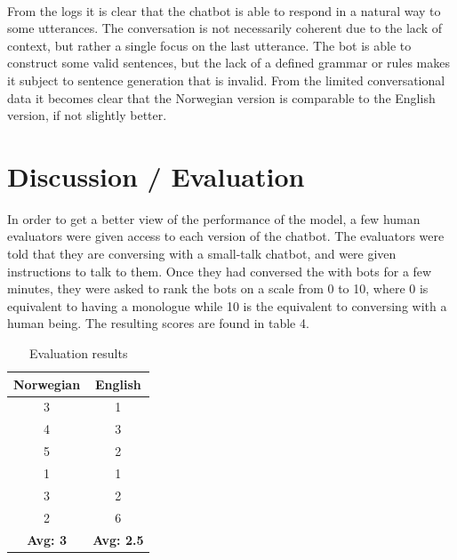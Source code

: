 \documentclass{article}
\begin{document}
\paragraph{}
From the logs it is clear that the chatbot is able to respond in a natural way
to some utterances. The conversation is not necessarily coherent due to the
lack of context, but rather a single focus on the last utterance. The bot is
able to construct some valid sentences, but the lack of a defined grammar or
rules makes it subject to sentence generation that is invalid.
From the limited conversational data it becomes clear that the Norwegian
version is comparable to the English version, if not slightly better.

\section*{Discussion / Evaluation}



In order to get a better view of the performance of the model, a few human
evaluators were given access to each version of the chatbot. The evaluators
were told that they are conversing with a small-talk chatbot, and were given
instructions to talk to them. Once they had conversed the with bots for a few
minutes, they were asked to rank the bots on a scale from 0 to 10, where 0
is equivalent to having a monologue while 10 is the equivalent to conversing
with a human being. The resulting scores are found in table 4.

\begin{table}[hbt!]
    \centering
    \begin{tabular}{|c|c|}
        \hline
        \textbf{Norwegian} & \textbf{English}\\
        \hline
        3 & 1\\
        4 & 3\\
        5 & 2\\
        1 & 1\\
        3 & 2\\
        2 & 6\\
        \hline
        \textbf{Avg: 3} & \textbf{Avg: 2.5}\\
        \hline
    \end{tabular}
    \caption{Evaluation results}
    \label{tab:evaluation-results}
\end{table}
\end{document}
